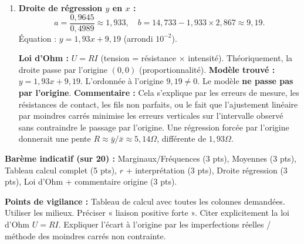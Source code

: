 \documentclass[11pt]{article}
\begin{document}
\begin{corrige}
\begin{enumerate}
\item \textbf{Droite de régression $y$ en $x$ :}
\[
a = \frac{0,9645}{0,4989} \approx 1,933, \quad b = 14,733 - 1,933 \times 2,867 \approx 9,19.
\]
Équation : $\boxed{y = 1,93x + 9,19}$ (arrondi $10^{-2}$).

\textbf{Loi d'Ohm :} $U = R I$ (tension = résistance $\times$ intensité). Théoriquement, la droite passe par l'origine $(0,0)$ (proportionnalité).
\textbf{Modèle trouvé :} $y = 1,93x + 9,19$. L'ordonnée à l'origine $9,19 \neq 0$. Le modèle \textbf{ne passe pas par l'origine}.
\textbf{Commentaire :} Cela s'explique par les erreurs de mesure, les résistances de contact, les fils non parfaits, ou le fait que l'ajustement linéaire par moindres carrés minimise les erreurs verticales sur l'intervalle observé sans contraindre le passage par l'origine. Une régression forcée par l'origine donnerait une pente $R \approx \bar{y}/\bar{x} \approx 5,14 \Omega$, différente de $1,93 \Omega$.
\end{enumerate}

\textbf{Barème indicatif (sur 20) :}
Marginaux/Fréquences (3 pts), Moyennes (3 pts), Tableau calcul complet (5 pts), $r$ + interprétation (3 pts), Droite régression (3 pts), Loi d'Ohm + commentaire origine (3 pts).

\textbf{Points de vigilance :} Tableau de calcul avec toutes les colonnes demandées. Utiliser les milieux. Préciser « liaison positive forte ». Citer explicitement la loi d'Ohm $U=RI$. Expliquer l'écart à l'origine par les imperfections réelles / méthode des moindres carrés non contrainte.
\end{corrige}
\end{document}
